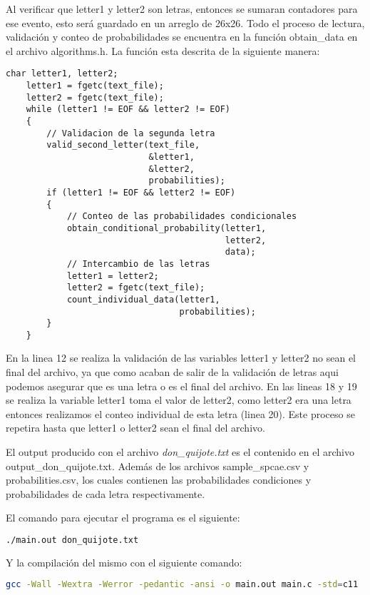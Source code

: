 Al verificar que letter1 y letter2 son letras, entonces se sumaran contadores para ese evento, esto será guardado en un arreglo de 26x26. Todo el proceso de lectura, validación y conteo de probabilidades se encuentra en la función \textcolor{title}{obtain\_data} en el archivo \textcolor{citecolor}{algorithms.h}. La función esta descrita de la siguiente manera:

\begin{lstlisting}[style=CStyle]
    char letter1, letter2;
    letter1 = fgetc(text_file);
    letter2 = fgetc(text_file);
    while (letter1 != EOF && letter2 != EOF)
    {
        // Validacion de la segunda letra
        valid_second_letter(text_file,
                            &letter1,
                            &letter2,
                            probabilities);
        if (letter1 != EOF && letter2 != EOF)
        {
            // Conteo de las probabilidades condicionales
            obtain_conditional_probability(letter1,
                                           letter2,
                                           data);
            // Intercambio de las letras
            letter1 = letter2;
            letter2 = fgetc(text_file);
            count_individual_data(letter1,
                                  probabilities);
        }
    }
\end{lstlisting}

En la linea 12 se realiza la validación de las variables letter1 y letter2 no sean el final del archivo, ya que como acaban de salir de la validación de letras aqui podemos asegurar que es una letra o es el final del archivo. En las lineas 18 y 19 se realiza la variable letter1 toma el valor de letter2, como letter2 era una letra entonces realizamos el conteo individual de esta letra (linea 20). Este proceso se repetira hasta que letter1 o letter2 sean el final del archivo.

El output producido con el archivo \textit{don\_quijote.txt} es el contenido en el archivo \textcolor{citecolor}{output\_don\_qui\-jote.txt}. Además de los archivos \textcolor{citecolor}{sample\_spcae.csv} y \textcolor{citecolor}{probabilities.csv}, los cuales contienen las probabilidades condiciones y probabilidades de cada letra respectivamente.

El comando para ejecutar el programa es el siguiente:

\begin{lstlisting}[language=bash]
    ./main.out don_quijote.txt
\end{lstlisting}

Y la compilación del mismo con el siguiente comando:

\begin{lstlisting}[language=bash]
    gcc -Wall -Wextra -Werror -pedantic -ansi -o main.out main.c -std=c11
\end{lstlisting}